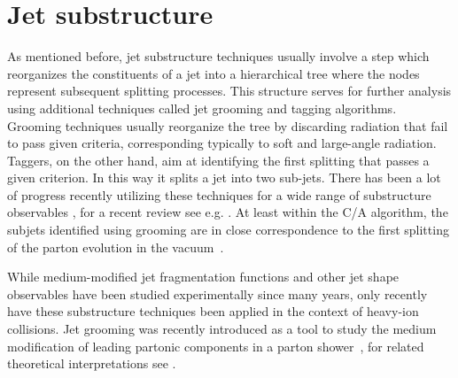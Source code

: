 
\section{Jet substructure}
\label{sec:jetsubstructure}

As mentioned before, jet substructure techniques usually involve a step which reorganizes the constituents of a jet into a hierarchical tree where the nodes represent subsequent splitting processes.
This structure serves for further analysis using additional techniques called jet grooming and tagging algorithms.
Grooming techniques usually reorganize the tree by discarding radiation that fail to pass given criteria, corresponding typically to soft and large-angle radiation. Taggers, on the other hand, aim at identifying the first splitting that passes a given criterion. In this way it splits a jet into two sub-jets. There has been a lot of progress recently utilizing these techniques for a wide range of substructure observables \cite{Butterworth:2008iy,Ellis:2009me,Krohn:2009th,Dasgupta:2013ihk,Larkoski:2014wba}, for a recent review see e.g. \cite{Larkoski:2017jix}. At least within the C/A algorithm, the subjets identified using grooming are in close correspondence to 
the first splitting of the parton evolution in the vacuum~\cite{Altarelli:1977zs,Larkoski:2015lea}.

While medium-modified jet fragmentation functions and other jet shape observables have been studied experimentally since many years, only recently have these substructure techniques been applied in the context of heavy-ion collisions.
Jet grooming was recently introduced as a tool to study the medium modification of leading partonic components in a parton shower~\cite{Sirunyan:2017bsd}, for related theoretical interpretations see \cite{Chien:2016led,Mehtar-Tani:2016aco,Milhano:2017nzm,Chang:2017gkt}. 

